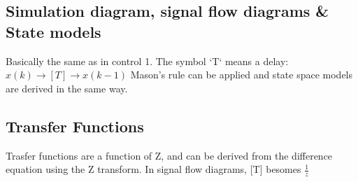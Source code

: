\documentclass{article}
\begin{document}
\subsection{Simulation diagram, signal flow diagrams \& State models} %
\label{sub:simulation_diagram_signal_flow_diagrams_state_models}
Basically the same as in control 1. The symbol `T` means a delay: $x(k) \to [T] \to x(k-1)$ Mason's rule can be applied and state space models are derived in the same way.
\subsection{Transfer Functions} %
\label{sub:transfer_functions}
Trasfer functions are a function of Z, and can be derived from the difference equation using the Z transform. In signal flow diagrams, [T] besomes $\frac{1}{z}$

\end{document}
